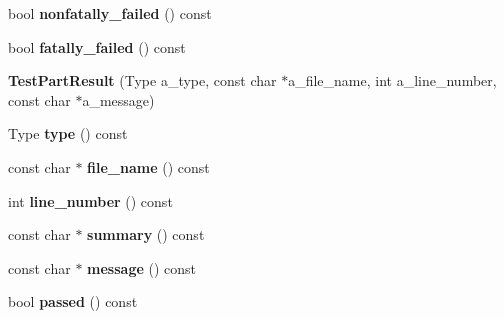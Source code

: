 \begin{DoxyCompactItemize}
\item 
\hypertarget{classtesting_1_1_test_part_result_a7bb08c87fbc1664f9fcca1504339ed29}{}bool {\bfseries nonfatally\+\_\+failed} () const \label{classtesting_1_1_test_part_result_a7bb08c87fbc1664f9fcca1504339ed29}

\item 
\hypertarget{classtesting_1_1_test_part_result_a34d31718b5fc6c06f73d03e8dbb1aa9e}{}bool {\bfseries fatally\+\_\+failed} () const \label{classtesting_1_1_test_part_result_a34d31718b5fc6c06f73d03e8dbb1aa9e}

\item 
\hypertarget{classtesting_1_1_test_part_result_a6409eb519c1cd514aab2426c8f40737f}{}{\bfseries Test\+Part\+Result} (Type a\+\_\+type, const char $\ast$a\+\_\+file\+\_\+name, int a\+\_\+line\+\_\+number, const char $\ast$a\+\_\+message)\label{classtesting_1_1_test_part_result_a6409eb519c1cd514aab2426c8f40737f}

\item 
\hypertarget{classtesting_1_1_test_part_result_ae852bf8693f066078c74c34345531940}{}Type {\bfseries type} () const \label{classtesting_1_1_test_part_result_ae852bf8693f066078c74c34345531940}

\item 
\hypertarget{classtesting_1_1_test_part_result_a5d8742dc28ddb880cd2391edb9fc2c9b}{}const char $\ast$ {\bfseries file\+\_\+name} () const \label{classtesting_1_1_test_part_result_a5d8742dc28ddb880cd2391edb9fc2c9b}

\item 
\hypertarget{classtesting_1_1_test_part_result_a174900cf4403d23784af34f50e7b0a46}{}int {\bfseries line\+\_\+number} () const \label{classtesting_1_1_test_part_result_a174900cf4403d23784af34f50e7b0a46}

\item 
\hypertarget{classtesting_1_1_test_part_result_af0d4f960b453ce087c581fe13817b2a3}{}const char $\ast$ {\bfseries summary} () const \label{classtesting_1_1_test_part_result_af0d4f960b453ce087c581fe13817b2a3}

\item 
\hypertarget{classtesting_1_1_test_part_result_aae73962246be4d200e2c1d04246a708a}{}const char $\ast$ {\bfseries message} () const \label{classtesting_1_1_test_part_result_aae73962246be4d200e2c1d04246a708a}

\item 
\hypertarget{classtesting_1_1_test_part_result_a901bd62d9fbe7f39826a9d02ab2bdaec}{}bool {\bfseries passed} () const \label{classtesting_1_1_test_part_result_a901bd62d9fbe7f39826a9d02ab2bdaec}


\end{DoxyCompactItemize}
